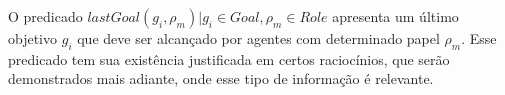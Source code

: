 O predicado $lastGoal(g_i,\rho_m) | g_i \in Goal, \rho_m \in Role $ apresenta um último objetivo $g_i$ que deve ser alcançado por agentes com determinado papel $\rho_{m}$. Esse predicado tem sua existência justificada em certos raciocínios, que serão demonstrados mais adiante, onde esse tipo de informação é relevante.